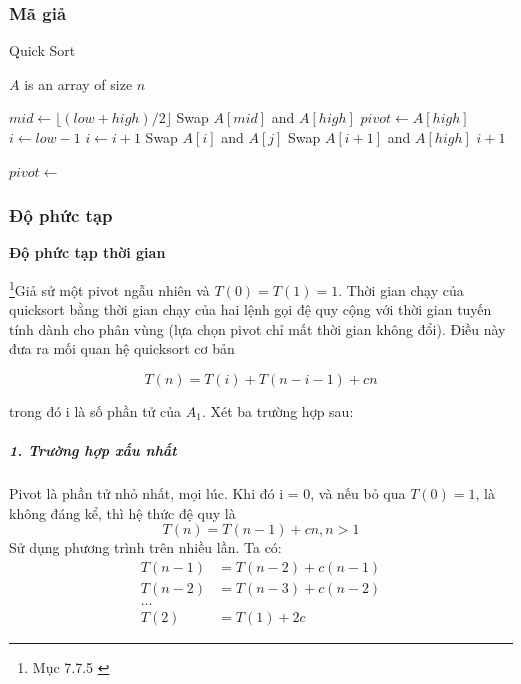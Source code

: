 \subsubsection{Mã giả}
 
\begin{algorithm}[H]
    \caption{Quick Sort}
    \label{alg:quick-sort}
    \begin{algorithmic}
    
    \Require $A$ is an array of size $n$
    
    \State $mid \gets \lfloor (low + high) / 2 \rfloor$
    \State Swap $A[mid]$ and $A[high]$
    \State $pivot \gets A[high]$
    \State $i \gets low - 1$
            \State $i \gets i + 1$
            \State Swap $A[i]$ and $A[j]$
        \EndIf
    \EndFor
    \State Swap $A[i+1]$ and $A[high]$
    \State \Return $i+1$
    \EndFunction
    
        \State $pivot \gets$  \State
         
        \State {} 
    \EndIf
    \EndFunction
    
    \end{algorithmic}
    \end{algorithm}


\subsubsection{Độ phức tạp}
\textbf{Độ phức tạp thời gian}

\footnote{Mục 7.7.5 \cite{dsa-analysis-cpp}}Giả sử một pivot ngẫu nhiên và $T(0) = T(1) = 1$. Thời gian chạy của quicksort bằng thời gian chạy của hai lệnh gọi đệ quy cộng với thời gian tuyến tính dành cho phân vùng (lựa chọn pivot chỉ mất thời gian không đổi). Điều này đưa ra mối quan hệ quicksort cơ bản 

\begin{equation}
T(n) = T(i) + T(n - i - 1) + cn \tag{2.8.1} 
\end{equation}

trong đó i là số phần tử của $A_1$. Xét ba trường hợp sau:

\subparagraph{1. Trường hợp xấu nhất}

Pivot là phần tử nhỏ nhất, mọi lúc. Khi đó i = 0, và nếu bỏ qua $ T(0) = 1$, là không đáng kể, thì hệ thức đệ quy là 
$$T(n) = T(n - 1) + cn,  n > 1$$ 								 
Sử dụng phương trình trên nhiều lần. Ta có:
\begin{align*}
T(n - 1) &= T(n - 2) + c(n - 1) \\
T(n - 2) &= T(n - 3) + c(n - 2) \\
\dots \\
T(2) &= T(1) + 2c   
\end{align*}
	 
